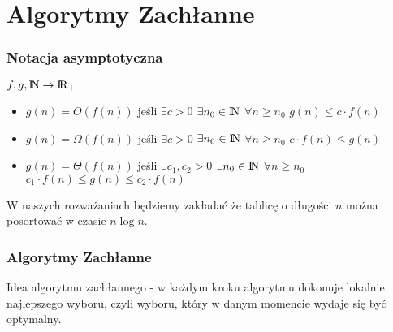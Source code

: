 \section{Algorytmy Zachłanne}
\subsubsection{Notacja asymptotyczna}
\(f,g,{\rm I\!N} \rightarrow {\rm I\!R}_+\)
\begin{itemize}
	\item \( g(n) = O(f(n))\) jeśli \(\exists{c}>0\) \(\exists{n_0}\in {\rm I\!N} \) \(\forall{n} \geq n_0\) \(g(n) \leq c \cdot f(n)\)
    \item \( g(n) = \Omega(f(n))\) jeśli \(\exists{c}>0\) \(\exists{n_0}\in {\rm I\!N} \) \(\forall{n} \geq n_0\) \(c \cdot f(n) \leq g(n)\)
    \item \( g(n) = \Theta(f(n))\) jeśli \(\exists{c_1,c_2}>0\) \(\exists{n_0}\in {\rm I\!N} \) \(\forall{n} \geq n_0\) \(c_1 \cdot f(n)\leq g(n) \leq c_2 \cdot f(n)\)
\end{itemize}
W naszych rozważaniach będziemy zakładać że tablicę o długości $n$ można posortować w czasie $n \log n$.

\subsubsection{Algorytmy Zachłanne}
Idea algorytmu zachłannego - w każdym kroku algorytmu dokonuje lokalnie najlepszego wyboru, czyli wyboru, który w danym momencie wydaje się być optymalny.
